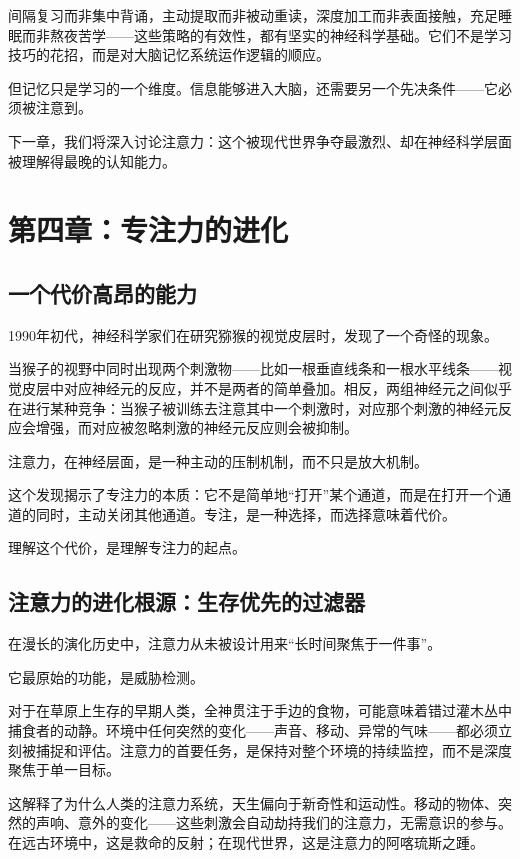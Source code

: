 \documentclass[11pt]{article}
\begin{document}
间隔复习而非集中背诵，主动提取而非被动重读，深度加工而非表面接触，充足睡眠而非熬夜苦学——这些策略的有效性，都有坚实的神经科学基础。它们不是学习技巧的花招，而是对大脑记忆系统运作逻辑的顺应。

但记忆只是学习的一个维度。信息能够进入大脑，还需要另一个先决条件——它必须被注意到。

下一章，我们将深入讨论注意力：这个被现代世界争夺最激烈、却在神经科学层面被理解得最晚的认知能力。
\section{第四章：专注力的进化}
\label{sec:org54790d8}

\subsection{一个代价高昂的能力}
\label{sec:orgb4af118}

1990年初代，神经科学家们在研究猕猴的视觉皮层时，发现了一个奇怪的现象。

当猴子的视野中同时出现两个刺激物——比如一根垂直线条和一根水平线条——视觉皮层中对应神经元的反应，并不是两者的简单叠加。相反，两组神经元之间似乎在进行某种竞争：当猴子被训练去注意其中一个刺激时，对应那个刺激的神经元反应会增强，而对应被忽略刺激的神经元反应则会被抑制。

注意力，在神经层面，是一种主动的压制机制，而不只是放大机制。

这个发现揭示了专注力的本质：它不是简单地“打开”某个通道，而是在打开一个通道的同时，主动关闭其他通道。专注，是一种选择，而选择意味着代价。

理解这个代价，是理解专注力的起点。
\subsection{注意力的进化根源：生存优先的过滤器}
\label{sec:org6e4e4e2}

在漫长的演化历史中，注意力从未被设计用来“长时间聚焦于一件事”。

它最原始的功能，是威胁检测。

对于在草原上生存的早期人类，全神贯注于手边的食物，可能意味着错过灌木丛中捕食者的动静。环境中任何突然的变化——声音、移动、异常的气味——都必须立刻被捕捉和评估。注意力的首要任务，是保持对整个环境的持续监控，而不是深度聚焦于单一目标。

这解释了为什么人类的注意力系统，天生偏向于新奇性和运动性。移动的物体、突然的声响、意外的变化——这些刺激会自动劫持我们的注意力，无需意识的参与。在远古环境中，这是救命的反射；在现代世界，这是注意力的阿喀琉斯之踵。
\end{document}

